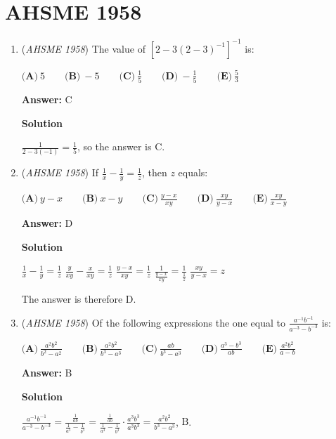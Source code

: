 \section{AHSME 1958}
        \begin{enumerate}
        	\item (\textit{AHSME 1958}) The value of $[2 - 3(2 - 3)^{-1}]^{-1}$ is:


 $\textbf{(A)}\ 5\qquad  \textbf{(B)}\ -5\qquad  \textbf{(C)}\ \frac{1}{5}\qquad  \textbf{(D)}\ -\frac{1}{5}\qquad  \textbf{(E)}\ \frac{5}{3}$

 \textbf{Answer: }C



\textbf{Solution}

$\frac{1}{2-3(-1)}=\frac{1}{5}$, so the answer is $\boxed{\text{C}}$. 

 


	\item (\textit{AHSME 1958}) If $\frac {1}{x} - \frac {1}{y} = \frac {1}{z}$, then $z$ equals:


 $\textbf{(A)}\ y - x\qquad \textbf{(B)}\ x - y\qquad \textbf{(C)}\ \frac {y - x}{xy}\qquad \textbf{(D)}\ \frac {xy}{y - x}\qquad \textbf{(E)}\ \frac {xy}{x - y}$

 \textbf{Answer: }D



\textbf{Solution}

$\frac{1}{x}-\frac{1}{y}=\frac{1}{z}$
$\frac{y}{xy}-\frac{x}{xy}=\frac{1}{z}$
$\frac{y-x}{xy}=\frac{1}{z}$
$\frac{1}{\frac{y-x}{xy}}=\frac{1}{\frac{1}{z}}$
$\frac{xy}{y-x}=z$

 The answer is therefore $\boxed{\text{D}}$.

 


	\item (\textit{AHSME 1958}) Of the following expressions the one equal to $\frac{a^{-1}b^{-1}}{a^{-3} - b^{-3}}$ is:


 $\textbf{(A)}\ \frac{a^2b^2}{b^2 - a^2}\qquad  \textbf{(B)}\ \frac{a^2b^2}{b^3 - a^3}\qquad  \textbf{(C)}\ \frac{ab}{b^3 - a^3}\qquad  \textbf{(D)}\ \frac{a^3 - b^3}{ab}\qquad  \textbf{(E)}\ \frac{a^2b^2}{a - b}$

 \textbf{Answer: }B



\textbf{Solution}

$\frac{a^{-1}b^{-1}}{a^{-3} - b^{-3}} =  \frac{\frac{1}{ab}}{\frac{1}{a^{3}}-\frac{1}{b^{3}}} =  \frac{\frac{1}{ab}}{\frac{1}{a^{3}}-\frac{1}{b^{3}}}\cdot\frac{a^{3}b^{3}}{a^{3}b^{3}} = \frac{a^{2}b^{2}}{b^{3}-a^{3}}$, $\boxed{\text{B}}$.


\end{enumerate}
